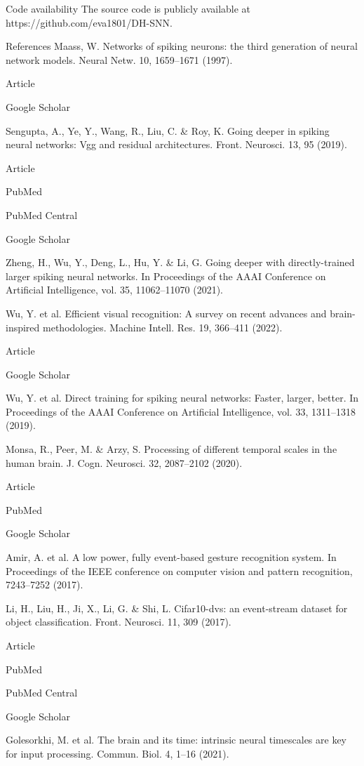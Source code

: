 Code availability
The source code is publicly available at https://github.com/eva1801/DH-SNN.

References
Maass, W. Networks of spiking neurons: the third generation of neural network models. Neural Netw. 10, 1659–1671 (1997).

Article
 
Google Scholar
 

Sengupta, A., Ye, Y., Wang, R., Liu, C. & Roy, K. Going deeper in spiking neural networks: Vgg and residual architectures. Front. Neurosci. 13, 95 (2019).

Article
 
PubMed
 
PubMed Central
 
Google Scholar
 

Zheng, H., Wu, Y., Deng, L., Hu, Y. & Li, G. Going deeper with directly-trained larger spiking neural networks. In Proceedings of the AAAI Conference on Artificial Intelligence, vol. 35, 11062–11070 (2021).

Wu, Y. et al. Efficient visual recognition: A survey on recent advances and brain-inspired methodologies. Machine Intell. Res. 19, 366–411 (2022).

Article
 
Google Scholar
 

Wu, Y. et al. Direct training for spiking neural networks: Faster, larger, better. In Proceedings of the AAAI Conference on Artificial Intelligence, vol. 33, 1311–1318 (2019).

Monsa, R., Peer, M. & Arzy, S. Processing of different temporal scales in the human brain. J. Cogn. Neurosci. 32, 2087–2102 (2020).

Article
 
PubMed
 
Google Scholar
 

Amir, A. et al. A low power, fully event-based gesture recognition system. In Proceedings of the IEEE conference on computer vision and pattern recognition, 7243–7252 (2017).

Li, H., Liu, H., Ji, X., Li, G. & Shi, L. Cifar10-dvs: an event-stream dataset for object classification. Front. Neurosci. 11, 309 (2017).

Article
 
PubMed
 
PubMed Central
 
Google Scholar
 

Golesorkhi, M. et al. The brain and its time: intrinsic neural timescales are key for input processing. Commun. Biol. 4, 1–16 (2021).

